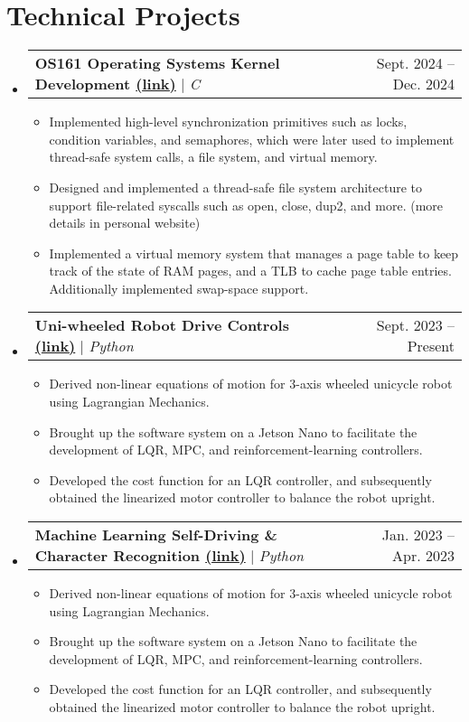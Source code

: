 \documentclass[letterpaper,11pt]{article}
\makeatletter
\newcommand{\resumeItem}[1]{
  \item\small{
    {#1 \vspace{-2pt}}
  }
}
\newcommand{\resumeProjectHeading}[2]{
    \item
    \begin{tabular*}{0.97\textwidth}{l@{\extracolsep{\fill}}r}
      \small#1 & #2 \\
    \end{tabular*}\vspace{-7pt}
}
\newcommand{\resumeSubHeadingListStart}{\begin{itemize}[leftmargin=0.15in, label={}]}
\newcommand{\resumeSubHeadingListEnd}{\end{itemize}}
\newcommand{\resumeItemListStart}{\begin{itemize}}
\newcommand{\resumeItemListEnd}{\end{itemize}\vspace{-5pt}}
\makeatother
\begin{document}
\section{Technical Projects}
    \resumeSubHeadingListStart
      \resumeProjectHeading
          {\textbf{OS161 Operating Systems Kernel Development \href{https://1mackenziekyle.github.io/os.html}{(\underline{link})}}
          $|$ \emph{C}
          }{Sept. 2024 -- Dec. 2024}
          \resumeItemListStart
            \resumeItem{Implemented high-level synchronization primitives such as locks, condition variables, and semaphores, which were later used 
            to implement thread-safe system calls, a file system, and virtual memory.}
            \resumeItem{Designed and implemented a thread-safe file system architecture to support file-related syscalls such as open, close, dup2, and more. (more details in personal website)}
            \resumeItem{Implemented a virtual memory system that manages a page table to keep track of the state of RAM pages, 
            and a TLB to cache page table entries. Additionally implemented swap-space support.}
          \resumeItemListEnd
        \resumeProjectHeading
          {\textbf{Uni-wheeled Robot Drive Controls \href{https://1mackenziekyle.github.io/learning-to-balance.html}{(\underline{link})}}
          $|$ \emph{Python}
          }{Sept. 2023 -- Present}
          \resumeItemListStart
            \resumeItem{Derived non-linear equations of motion for 3-axis wheeled unicycle robot using Lagrangian Mechanics.}
            \resumeItem{Brought up the software system on a Jetson Nano to facilitate the development of LQR, MPC, and reinforcement-learning controllers.}
            \resumeItem{Developed the cost function for an LQR controller, and subsequently obtained the linearized motor controller to balance the robot upright.}
          \resumeItemListEnd
        \resumeProjectHeading
          {\textbf{Machine Learning Self-Driving \& Character Recognition \href{https://1mackenziekyle.github.io/machine-learning.html}{(\underline{link})}}
          $|$ \emph{Python}
          }{Jan. 2023 -- Apr. 2023}
          \resumeItemListStart
            \resumeItem{Derived non-linear equations of motion for 3-axis wheeled unicycle robot using Lagrangian Mechanics.}
            \resumeItem{Brought up the software system on a Jetson Nano to facilitate the development of LQR, MPC, and reinforcement-learning controllers.}
            \resumeItem{Developed the cost function for an LQR controller, and subsequently obtained the linearized motor controller to balance the robot upright.}
          \resumeItemListEnd
    \resumeSubHeadingListEnd
\end{document}
